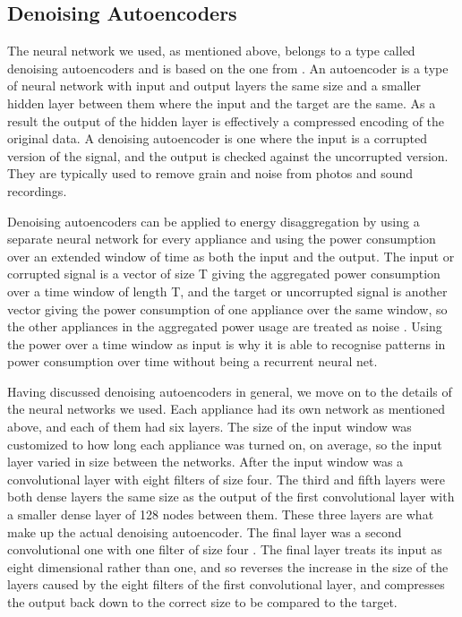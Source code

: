 \documentclass{article}
\begin{document}
\subsection{Denoising Autoencoders}

The neural network we used, as mentioned above, belongs to a type called denoising autoencoders and is based on the one from \cite{Kelly}. An autoencoder is a type of neural network with input and output layers the same size and a smaller hidden layer between them where the input and the target are the same. As a result the output of the hidden layer is effectively a compressed encoding of the original data. A denoising autoencoder is one where the input is a corrupted version of the signal, and the output is checked against the uncorrupted version. They are typically used to remove grain and noise from photos and sound recordings. 

Denoising autoencoders can be applied to energy disaggregation by using a separate neural network for every appliance and using the power consumption over an extended window of time as both the input and the output. The input or corrupted signal is a vector of size T giving the aggregated power consumption over a time window of length T, and the target or uncorrupted signal is another vector giving the power consumption of one appliance over the same window, so the other appliances in the aggregated power usage are treated as noise \cite{Kelly}. Using the power over a time window as input is why it is able to recognise patterns in power consumption over time without being a recurrent neural net.

Having discussed denoising autoencoders in general, we move on to the details of the neural networks we used. Each appliance had its own network as mentioned above, and each of them had six layers. The size of the input window was customized to how long each appliance was turned on, on average, so the input layer varied in size between the networks. After the input window was a convolutional layer with eight filters of size four. The third and fifth layers were both dense layers the same size as the output of the first convolutional layer with a smaller dense layer of 128 nodes between them. These three layers are what make up the actual denoising autoencoder. The final layer was a second convolutional one with one filter of size four \cite{Kelly}. The final layer treats its input as eight dimensional rather than one, and so reverses the increase in the size of the layers caused by the eight filters of the first convolutional layer, and compresses the output back down to the correct size to be compared to the target.
\end{document}
